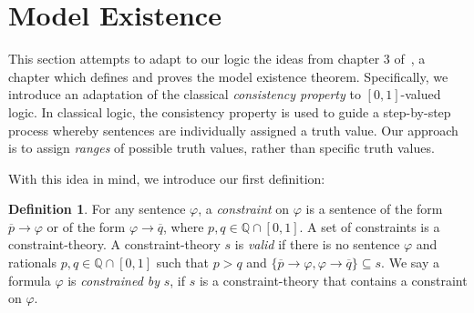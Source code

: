 \documentclass{amsart}
\theoremstyle{definition}
\newtheorem{definition}[theorem]{Definition}
\numberwithin{equation}{theorem}
\renewcommand{\phi}{\varphi}
\newcommand{\Q}{\mathbb{Q}}
\newcommand{\rat}[1]{{\overline{#1}}}
\newcommand{\narrow}[1]{\xrightarrow{#1}}
\renewcommand{\to}{\narrow{}}
\begin{document}
\section{Model Existence}
This section attempts to adapt to our logic the ideas from chapter 3 of~\cite{keisler1971model}, a chapter which defines and proves the model existence theorem.
Specifically, we introduce an adaptation of the classical \emph{consistency property} to $[0,1]$-valued logic.
In classical logic, the consistency property is used to guide a step-by-step process whereby sentences are individually assigned a truth value.
Our approach is to assign \emph{ranges} of possible truth values, rather than specific truth values.

With this idea in mind, we introduce our first definition:
\begin{definition}\label{def:constraint}
  For any sentence $\phi$, a \emph{constraint} on $\phi$ is a sentence of the form $\rat p\to\phi$ or of the form $\phi\to\rat q$, where $p,q\in\Q\cap[0,1]$.
  A set of constraints is a constraint-theory.
  A constraint-theory $s$ is \emph{valid} if there is no sentence $\phi$ and rationals $p,q\in\Q\cap[0,1]$ such that $p>q$ and $\{\rat p\to\phi,\phi\to\rat q\}\subseteq s$.
  We say a formula $\phi$ is \emph{constrained by} $s$, if $s$ is a constraint-theory that contains a constraint on $\phi$.
\end{definition}
\end{document}
